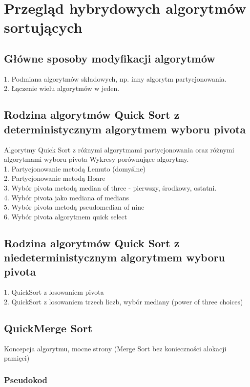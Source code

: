 \chapter{Przegląd hybrydowych algorytmów sortujących}
\thispagestyle{chapterBeginStyle}

\section{Główne sposoby modyfikacji algorytmów}
1. Podmiana algorytmów składowych, np. inny algorytm partycjonowania.\\
2. Łączenie wielu algorytmów w jeden.

\section{Rodzina algorytmów Quick Sort z deterministycznym algorytmem wyboru pivota}
Algorytmy Quick Sort z różnymi algorytmami partycjonowania oraz różnymi algorytmami wyboru pivota
Wykresy porównujące algorytmy.\\
1. Partycjonowanie metodą Lemuto (domyślne)\\
2. Partycjonowanie metodą Hoare\\
3. Wybór pivota metodą median of three - pierwszy, środkowy, ostatni.\\
4. Wybór pivota jako mediana of medians\\
5. Wybór pivota metodą pseudomedian of nine\\
6. Wybór pivota algorytmem quick select


\section{Rodzina algorytmów Quick Sort z niedeterministycznym algorytmem wyboru pivota}
1. QuickSort z losowaniem pivota\\
2. QuickSort z losowaniem trzech liczb, wybór mediany (power of three choices)\\

\section{QuickMerge Sort}
Koncepcja algorytmu, mocne strony (Merge Sort bez konieczności alokacji pamięci)

\subsection{Pseudokod}

